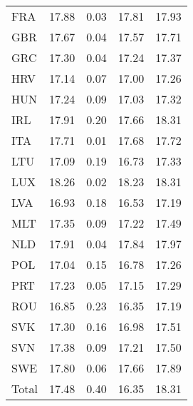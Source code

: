\begin{table}[t!]
\begin{threeparttable}
{\begin{tabular}{l*{1}{cccc}}
FRA                 &       17.88&        0.03&       17.81&       17.93\\
GBR                 &       17.67&        0.04&       17.57&       17.71\\
GRC                 &       17.30&        0.04&       17.24&       17.37\\
HRV                 &       17.14&        0.07&       17.00&       17.26\\
HUN                 &       17.24&        0.09&       17.03&       17.32\\
IRL                 &       17.91&        0.20&       17.66&       18.31\\
ITA                 &       17.71&        0.01&       17.68&       17.72\\
LTU                 &       17.09&        0.19&       16.73&       17.33\\
LUX                 &       18.26&        0.02&       18.23&       18.31\\
LVA                 &       16.93&        0.18&       16.53&       17.19\\
MLT                 &       17.35&        0.09&       17.22&       17.49\\
NLD                 &       17.91&        0.04&       17.84&       17.97\\
POL                 &       17.04&        0.15&       16.78&       17.26\\
PRT                 &       17.23&        0.05&       17.15&       17.29\\
ROU                 &       16.85&        0.23&       16.35&       17.19\\
SVK                 &       17.30&        0.16&       16.98&       17.51\\
SVN                 &       17.38&        0.09&       17.21&       17.50\\
SWE                 &       17.80&        0.06&       17.66&       17.89\\
Total               &       17.48&        0.40&       16.35&       18.31\\
\bottomrule
\end{tabular}}
\end{threeparttable}
\end{table}
